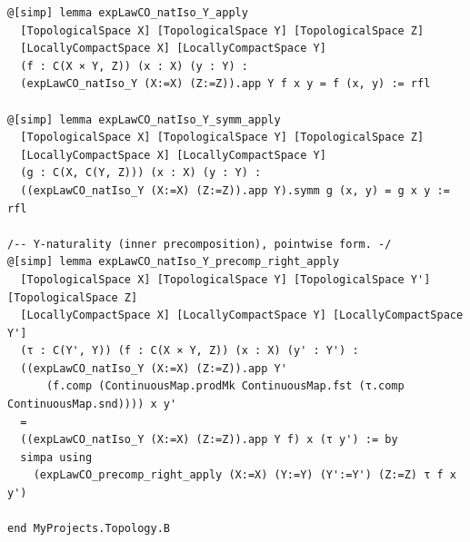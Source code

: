 \documentclass[12pt]{article}
\begin{document}
\begin{lstlisting}
@[simp] lemma expLawCO_natIso_Y_apply
  [TopologicalSpace X] [TopologicalSpace Y] [TopologicalSpace Z]
  [LocallyCompactSpace X] [LocallyCompactSpace Y]
  (f : C(X × Y, Z)) (x : X) (y : Y) :
  (expLawCO_natIso_Y (X:=X) (Z:=Z)).app Y f x y = f (x, y) := rfl

@[simp] lemma expLawCO_natIso_Y_symm_apply
  [TopologicalSpace X] [TopologicalSpace Y] [TopologicalSpace Z]
  [LocallyCompactSpace X] [LocallyCompactSpace Y]
  (g : C(X, C(Y, Z))) (x : X) (y : Y) :
  ((expLawCO_natIso_Y (X:=X) (Z:=Z)).app Y).symm g (x, y) = g x y := rfl

/-- Y‑naturality (inner precomposition), pointwise form. -/
@[simp] lemma expLawCO_natIso_Y_precomp_right_apply
  [TopologicalSpace X] [TopologicalSpace Y] [TopologicalSpace Y'] [TopologicalSpace Z]
  [LocallyCompactSpace X] [LocallyCompactSpace Y] [LocallyCompactSpace Y']
  (τ : C(Y', Y)) (f : C(X × Y, Z)) (x : X) (y' : Y') :
  ((expLawCO_natIso_Y (X:=X) (Z:=Z)).app Y'
      (f.comp (ContinuousMap.prodMk ContinuousMap.fst (τ.comp ContinuousMap.snd)))) x y'
  =
  ((expLawCO_natIso_Y (X:=X) (Z:=Z)).app Y f) x (τ y') := by
  simpa using
    (expLawCO_precomp_right_apply (X:=X) (Y:=Y) (Y':=Y') (Z:=Z) τ f x y')

end MyProjects.Topology.B

\end{lstlisting}
\end{document}
